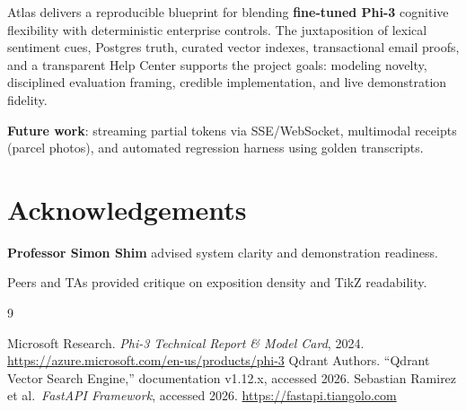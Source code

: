 \documentclass[11pt,a4paper,twoside]{report}
\begin{document}
Atlas delivers a reproducible blueprint for blending \textbf{fine-tuned Phi-3} cognitive flexibility with deterministic enterprise controls.
The juxtaposition of lexical sentiment cues, Postgres truth, curated vector indexes, transactional email proofs, and a transparent Help Center supports the project goals: modeling novelty, disciplined evaluation framing, credible implementation, and live demonstration fidelity.

\textbf{Future work}: streaming partial tokens via SSE/WebSocket, multimodal receipts (parcel photos), and automated regression harness using golden transcripts.

\section*{Acknowledgements}
\textbf{Professor Simon Shim} advised system clarity and demonstration readiness.\par\vspace{2mm}
Peers and TAs provided critique on exposition density and TikZ readability.

\begin{thebibliography}{9}
\raggedright
{}Microsoft Research. \textit{Phi-3 Technical Report \& Model Card}, 2024. \newline \url{https://azure.microsoft.com/en-us/products/phi-3}
Qdrant Authors. ``Qdrant Vector Search Engine,'' documentation v1.12.x, accessed 2026.
Sebastian Ramirez et al.\ \textit{FastAPI Framework}, accessed 2026. \newline \url{https://fastapi.tiangolo.com}
\end{thebibliography}
\end{document}

